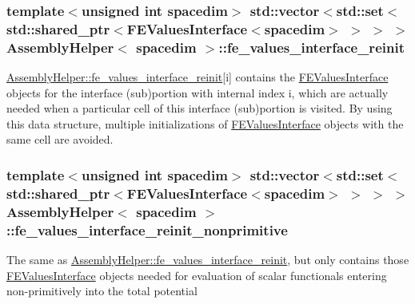 \subsubsection[{\texorpdfstring{fe\+\_\+values\+\_\+interface\+\_\+reinit}{fe_values_interface_reinit}}]{\setlength{\rightskip}{0pt plus 5cm}template$<$unsigned int spacedim$>$ std\+::vector$<$std\+::set$<$std\+::shared\+\_\+ptr$<${\bf F\+E\+Values\+Interface}$<$spacedim$>$ $>$ $>$ $>$ {\bf Assembly\+Helper}$<$ spacedim $>$\+::fe\+\_\+values\+\_\+interface\+\_\+reinit\hspace{0.3cm}{\ttfamily [private]}}\hypertarget{class_assembly_helper_ac9789c5a00867744dd906b85580e3091}{}\label{class_assembly_helper_ac9789c5a00867744dd906b85580e3091}
\hyperlink{class_assembly_helper_ac9789c5a00867744dd906b85580e3091}{Assembly\+Helper\+::fe\+\_\+values\+\_\+interface\+\_\+reinit}\mbox{[}{\ttfamily i}\mbox{]} contains the \hyperlink{class_f_e_values_interface}{F\+E\+Values\+Interface} objects for the interface (sub)portion with internal index {\ttfamily i}, which are actually needed when a particular cell of this interface (sub)portion is visited. By using this data structure, multiple initializations of \hyperlink{class_f_e_values_interface}{F\+E\+Values\+Interface} objects with the same cell are avoided. 
\subsubsection[{\texorpdfstring{fe\+\_\+values\+\_\+interface\+\_\+reinit\+\_\+nonprimitive}{fe_values_interface_reinit_nonprimitive}}]{\setlength{\rightskip}{0pt plus 5cm}template$<$unsigned int spacedim$>$ std\+::vector$<$std\+::set$<$std\+::shared\+\_\+ptr$<${\bf F\+E\+Values\+Interface}$<$spacedim$>$ $>$ $>$ $>$ {\bf Assembly\+Helper}$<$ spacedim $>$\+::fe\+\_\+values\+\_\+interface\+\_\+reinit\+\_\+nonprimitive\hspace{0.3cm}{\ttfamily [private]}}\hypertarget{class_assembly_helper_afaa20027ee539ca8d9c40c317127e471}{}\label{class_assembly_helper_afaa20027ee539ca8d9c40c317127e471}
The same as \hyperlink{class_assembly_helper_ac9789c5a00867744dd906b85580e3091}{Assembly\+Helper\+::fe\+\_\+values\+\_\+interface\+\_\+reinit}, but only contains those \hyperlink{class_f_e_values_interface}{F\+E\+Values\+Interface} objects needed for evaluation of scalar functionals entering non-\/primitively into the total potential 
